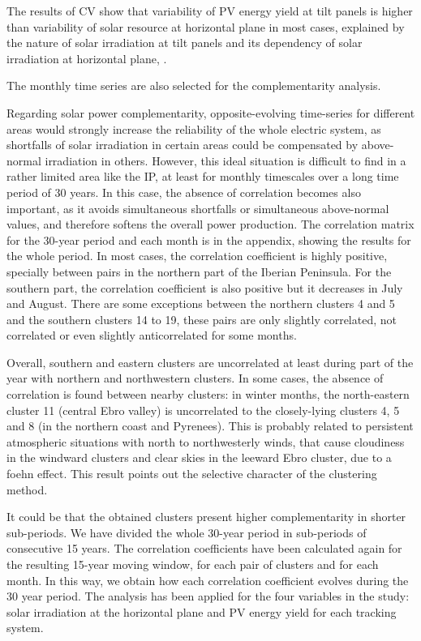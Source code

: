 The results of CV show that variability of PV energy yield at tilt panels is higher than variability of solar resource at horizontal plane in most cases, explained by the nature of solar irradiation at tilt panels and its dependency of solar irradiation at horizontal plane, \cite{Perpinan2009}.

The monthly time series are also selected for the complementarity analysis.

Regarding solar power complementarity, opposite-evolving time-series for different areas would strongly increase the reliability of the whole electric system, as shortfalls of solar irradiation in certain areas could be compensated by above-normal irradiation in others. However, this ideal situation is difficult to find in a rather limited area like the IP, at least for monthly timescales over a long time period of 30 years. In this case, the absence of correlation becomes also important, as it avoids simultaneous shortfalls or simultaneous above-normal values, and therefore softens the overall power production. The correlation matrix for the 30-year period and each month is in the appendix, showing the results for the whole period. In most cases, the correlation coefficient is highly positive, specially between pairs in the northern part of the Iberian Peninsula. For the southern part, the correlation coefficient is also positive but it decreases in July and August. There are some exceptions between the northern clusters 4 and 5 and the southern clusters 14 to 19, these pairs are only slightly correlated, not correlated or even slightly anticorrelated for some months.

Overall, southern and eastern clusters are uncorrelated at least during part of the year with northern and northwestern clusters. In some cases, the absence of correlation is found between nearby clusters: in winter months, the north-eastern cluster 11 (central Ebro valley) is uncorrelated to the closely-lying clusters 4, 5 and 8 (in the northern coast and Pyrenees). This is probably related to persistent atmospheric situations with north to northwesterly winds, that cause cloudiness in the windward clusters and clear skies in the leeward Ebro cluster, due to a foehn effect. This result points out the selective character of the clustering method.

It could be that the obtained clusters present higher complementarity in shorter sub-periods. We have divided the whole 30-year period in sub-periods of consecutive 15 years. The correlation coefficients have been calculated again for the resulting 15-year moving window, for each pair of clusters and for each month. In this way, we obtain how each correlation coefficient evolves during the 30 year period. The analysis has been applied for the four variables in the study: solar irradiation at the horizontal plane and PV energy yield for each tracking system.

